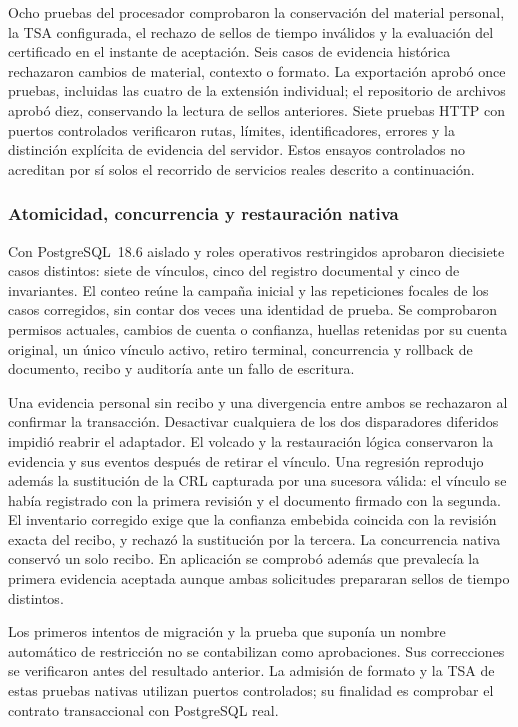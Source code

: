 Ocho pruebas del procesador comprobaron la conservación del material personal,
la TSA configurada, el rechazo de sellos de tiempo inválidos y la evaluación
del certificado en el instante de aceptación. Seis casos de evidencia
histórica rechazaron cambios de material, contexto o formato. La exportación
aprobó once pruebas, incluidas las cuatro de la extensión individual; el
repositorio de archivos aprobó diez, conservando la lectura de sellos anteriores.
Siete pruebas HTTP con puertos controlados verificaron rutas, límites,
identificadores, errores y la distinción explícita de evidencia del servidor.
Estos ensayos controlados no acreditan por sí solos el recorrido de servicios
reales descrito a continuación.

\subsubsection{Atomicidad, concurrencia y restauración nativa}

Con PostgreSQL~18.6 aislado y roles operativos restringidos aprobaron diecisiete
casos distintos: siete de vínculos, cinco del registro documental y cinco de
invariantes. El conteo reúne la campaña inicial y las repeticiones focales de
los casos corregidos, sin contar dos veces una identidad de prueba. Se
comprobaron permisos actuales, cambios de cuenta o confianza, huellas retenidas
por su cuenta original, un único vínculo activo, retiro terminal, concurrencia
y rollback de documento, recibo y auditoría ante un fallo de escritura.

Una evidencia personal sin recibo y una divergencia entre ambos se rechazaron
al confirmar la transacción. Desactivar cualquiera de los dos disparadores
diferidos impidió reabrir el adaptador. El volcado y la restauración lógica
conservaron la evidencia y sus eventos después de retirar el vínculo. Una
regresión reprodujo además la sustitución de la CRL capturada por una sucesora
válida: el vínculo se había registrado con la primera revisión y el documento
firmado con la segunda. El inventario corregido exige que la confianza
embebida coincida con la revisión exacta del recibo, y rechazó la sustitución
por la tercera. La concurrencia nativa conservó un solo recibo. En aplicación
se comprobó además que prevalecía la primera evidencia aceptada aunque ambas
solicitudes prepararan sellos de tiempo distintos.

Los primeros intentos de migración y la prueba que suponía un nombre automático
de restricción no se contabilizan como aprobaciones. Sus correcciones se
verificaron antes del resultado anterior. La admisión de formato y la TSA de
estas pruebas nativas utilizan puertos controlados; su finalidad es comprobar
el contrato transaccional con PostgreSQL real.


